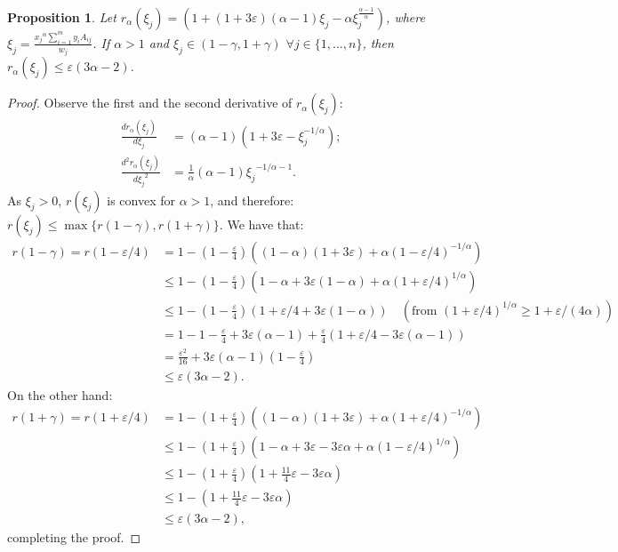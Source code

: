 \documentclass[11pt]{article}
\newtheorem{proposition}[theorem]{Proposition}
\begin{document}
\begin{proposition}\label{prop:alpha>1-r-bound}
Let $r_\alpha(\xi_j) =\left(1 + (1+3\varepsilon)(\alpha-1)\xi_j - \alpha\xi_j^{\frac{\alpha-1}{\alpha}} \right)$, where $\xi_j = \frac{{x_j}^{\alpha}\sum_{i=1}^m y_i A_{ij}}{w_j}$. If $\alpha > 1$ and
$ \xi_j\in (1-\gamma, 1+\gamma)$ $\forall j\in \{1,...,n\}$, 
then $r_\alpha(\xi_j)\leq \varepsilon(3\alpha-2)$.
\end{proposition}
\begin{proof}

Observe the first and the second derivative of $r_\alpha(\xi_j)$:
\begin{align*}
\frac{d r_\alpha(\xi_j)}{d \xi_j} 
&= (\alpha-1)(1+ 3\varepsilon - \xi_j^{-1/\alpha});\\
\frac{d^2 r_\alpha(\xi_j)}{d{\xi_j}^2}&= \frac{1}{\alpha}(\alpha-1){\xi_j}^{-1/\alpha-1}.
\end{align*}
As $\xi_j>0$, $r(\xi_j)$ is convex for $\alpha>1$, and therefore: 
$
r(\xi_j)\leq \max\{r(1-\gamma), r(1+\gamma)\}.
$ 
We have that:
\begin{align*}
r(1-\gamma) = r(1-\varepsilon/4) &= 1- \left(1-\frac{\varepsilon}{4}\right)((1-\alpha)(1+3\varepsilon)+\alpha(1-\varepsilon/4)^{-1/\alpha})\\
&\leq 1 - \left(1-\frac{\varepsilon}{4}\right)(1-\alpha + 3\varepsilon(1 -  \alpha) + \alpha(1+\varepsilon/4)^{1/\alpha})\\
&\leq 1 - \left(1-\frac{\varepsilon}{4}\right)(1+ \varepsilon/4+ 3\varepsilon(1-\alpha)) \quad (\text{from }(1+\varepsilon/4)^{1/\alpha}\geq 1+ {\varepsilon}/({4\alpha}))\\
&= 1 - 1 - \frac{\varepsilon}{4} + 3\varepsilon(\alpha-1)+\frac{\varepsilon}{4}(1+\varepsilon/4-3\varepsilon(\alpha-1))\\
&= \frac{\varepsilon^2}{16} + 3\varepsilon(\alpha-1)\left(1-\frac{\varepsilon}{4}\right)\\
&\leq \varepsilon(3\alpha-2).
\end{align*}
On the other hand:
\begin{align*}
r(1+\gamma) = r(1+\varepsilon/4) &= 1- \left(1+\frac{\varepsilon}{4}\right)((1-\alpha)(1+3\varepsilon)+\alpha(1+\varepsilon/4)^{-1/\alpha})\\
&\leq 1- \left(1+\frac{\varepsilon}{4}\right)(1-\alpha + 3\varepsilon - 3\varepsilon \alpha + \alpha(1-\varepsilon/4)^{1/\alpha})\\
&\leq 1- \left(1+\frac{\varepsilon}{4}\right)\left(1+\frac{11}{4}\varepsilon-3\varepsilon\alpha\right)\\
&\leq 1 - \left(1+\frac{11}{4}\varepsilon - 3\varepsilon\alpha\right)\\
&\leq \varepsilon(3\alpha-2),
\end{align*}
completing the proof.
\end{proof}
\end{document}
